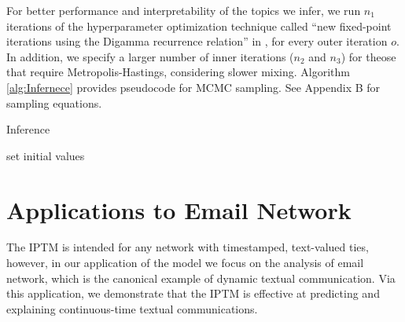 \documentclass[twoside]{article}
\begin{document}
For better performance and interpretability of the topics we infer, we run $n_1$ iterations of the hyperparameter optimization technique called ``new fixed-point iterations using the Digamma recurrence relation'' in \cite{wallach2008structured}, for every outer iteration $o$. In addition, we specify a larger number of inner iterations ($n_2$ and $n_3$) for theose that require Metropolis-Hastings, considering slower mixing. Algorithm \ref{alg:Infernece} provides pseudocode for MCMC sampling. See Appendix B for sampling equations.
  \begin{algorithm}[H]
  	\footnotesize
  	\SetAlgoLined
  	\caption{Inference}
  	set initial values\\
  	\label{alg:Infernece}
  \end{algorithm}
  

\section{Applications to Email Network}\label{sec:Application}
The IPTM is intended for any network with timestamped, text-valued ties, however, in our application of the model we focus on the analysis of email network, which is the canonical example of dynamic textual communication. Via this application, we demonstrate that the IPTM is effective at predicting
and explaining continuous-time textual communications.
\end{document}
